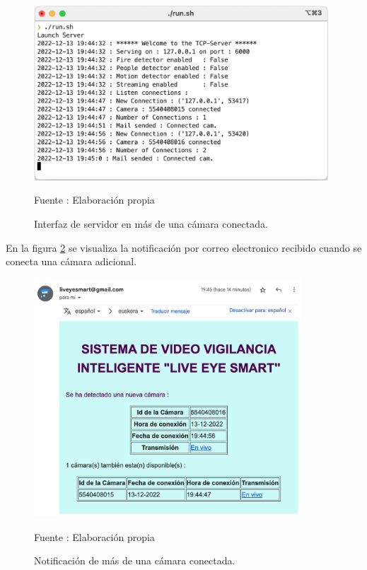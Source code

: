 \begin{figure}[H]
    \begin{center}
        \includegraphics[width=11cm]{img/capitulo_6/server_cam_connected_more_cams.png}
    \end{center}
    \begin{center}
        \caption{Interfaz de servidor en más de una cámara conectada.}
        Fuente : Elaboración propia
        \label{n_cameras_connected}
    \end{center}
\end{figure}

En la figura \ref{notif_mail_n_cameras} se visualiza la notificación por correo electronico recibido cuando se conecta una cámara adicional.

\begin{figure}[H]
    \begin{center}
        \includegraphics[width=10cm]{img/capitulo_6/mail2.png}
    \end{center}
    \begin{center}
        \caption{Notificación de más de una cámara conectada.}
        Fuente : Elaboración propia
        \label{notif_mail_n_cameras}
    \end{center}
\end{figure}

